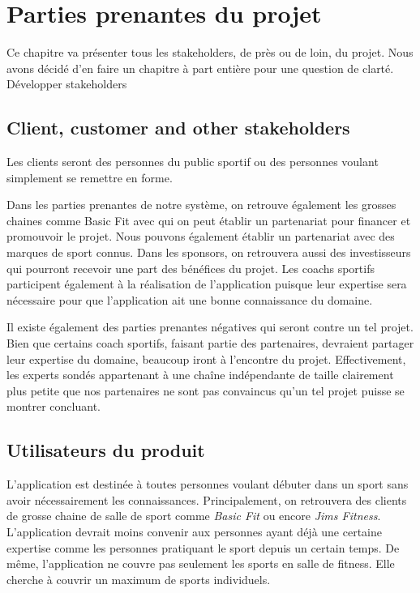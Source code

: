 \chapter{Parties prenantes du projet}

Ce chapitre va présenter tous les stakeholders, de près ou de loin, du projet. Nous avons décidé d'en faire un chapitre à part entière pour une question de clarté. Développer stakeholders

\section{Client, customer and other stakeholders}

Les clients seront des personnes du public sportif ou des personnes voulant simplement se remettre en forme. 

Dans les parties prenantes de notre système, on retrouve également les grosses chaines comme Basic Fit avec qui on peut établir un partenariat pour financer et promouvoir le projet. Nous pouvons également établir un partenariat avec des marques de sport connus. Dans les sponsors, on retrouvera aussi  des investisseurs qui pourront recevoir une part des bénéfices du projet. Les coachs sportifs participent également à la réalisation de l'application puisque leur expertise sera nécessaire pour que l'application ait une bonne connaissance du domaine. 

Il existe également des parties prenantes négatives qui seront contre un tel projet. Bien que certains coach sportifs, faisant partie des partenaires, devraient partager leur expertise du domaine, beaucoup iront à l'encontre du projet. Effectivement, les experts sondés appartenant à une chaîne indépendante de taille clairement plus petite que nos partenaires ne sont pas convaincus qu'un tel projet puisse se montrer concluant. 

\section{Utilisateurs du produit}

L'application est destinée à toutes personnes voulant débuter dans un sport sans avoir nécessairement les connaissances. Principalement, on retrouvera des clients de grosse chaine de salle de sport comme \textit{Basic Fit} ou encore \textit{Jims Fitness}. L'application devrait moins convenir aux personnes ayant déjà une certaine expertise comme les personnes pratiquant le sport depuis un certain temps. De même, l'application ne couvre pas seulement les sports en salle de fitness. Elle cherche à couvrir un maximum de sports individuels.

